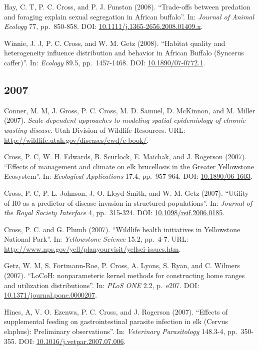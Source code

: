 \documentclass[12pt,]{article}
\begin{document}
Hay, C. T, P. C. Cross, and P. J. Funston (2008). ``Trade-offs between
predation and foraging explain sexual segregation in African buffalo''.
In: \emph{Journal of Animal Ecology} 77, pp.~850-858. DOI:
\href{https://doi.org/10.1111\%2Fj.1365-2656.2008.01409.x}{10.1111/j.1365-2656.2008.01409.x}.

Winnie, J. J, P. C. Cross, and W. M. Getz (2008). ``Habitat quality and
heterogeneity influence distribution and behavior in African Buffalo
(Syncerus caffer)''. In: \emph{Ecology} 89.5, pp.~1457-1468. DOI:
\href{https://doi.org/10.1890\%2F07-0772.1}{10.1890/07-0772.1}.

\hypertarget{section-12}{%
\subsection{2007}\label{section-12}}

Conner, M. M, J. Gross, P. C. Cross, M. D. Samuel, D. McKinnon, and M.
Miller (2007). \emph{Scale-dependent approaches to modeling spatial
epidemiology of chronic wasting disease}. Utah Division of Wildlife
Resources. URL: \url{http://wildlife.utah.gov/diseases/cwd/e-book/}.

Cross, P. C, W. H. Edwards, B. Scurlock, E. Maichak, and J. Rogerson
(2007). ``Effects of management and climate on elk brucellosis in the
Greater Yellowstone Ecosystem''. In: \emph{Ecological Applications}
17.4, pp.~957-964. DOI:
\href{https://doi.org/10.1890\%2F06-1603}{10.1890/06-1603}.

Cross, P. C, P. L. Johnson, J. O. Lloyd-Smith, and W. M. Getz (2007).
``Utility of R0 as a predictor of disease invasion in structured
populations''. In: \emph{Journal of the Royal Society Interface} 4,
pp.~315-324. DOI:
\href{https://doi.org/10.1098\%2Frsif.2006.0185}{10.1098/rsif.2006.0185}.

Cross, P. C. and G. Plumb (2007). ``Wildlife health initiatives in
Yellowstone National Park''. In: \emph{Yellowstone Science} 15.2,
pp.~4-7. URL:
\url{http://www.nps.gov/yell/planyourvisit/yellsci-issues.htm}.

Getz, W. M, S. Fortmann-Roe, P. Cross, A. Lyons, S. Ryan, and C. Wilmers
(2007). ``LoCoH: nonparameteric kernel methods for constructing home
ranges and utilization distributions''. In: \emph{PLoS ONE} 2.2,
p.~e207. DOI:
\href{https://doi.org/10.1371\%2Fjournal.pone.0000207}{10.1371/journal.pone.0000207}.

Hines, A, V. O. Ezenwa, P. C. Cross, and J. Rogerson (2007). ``Effects
of supplemental feeding on gastrointestinal parasite infection in elk
(Cervus elaphus): Preliminary observations''. In: \emph{Veterinary
Parasitology} 148.3-4, pp.~350-355. DOI:
\href{https://doi.org/10.1016\%2Fj.vetpar.2007.07.006}{10.1016/j.vetpar.2007.07.006}.
\end{document}
